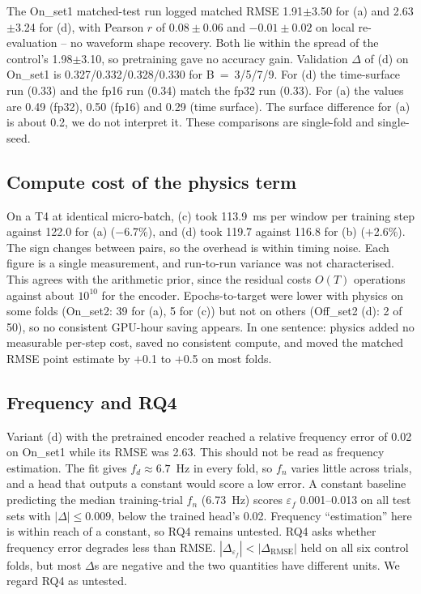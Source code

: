\documentclass[conference]{IEEEtran}
\begin{document}
The On\_set1 matched-test run logged matched RMSE 1.91$\pm$3.50 for (a) and 2.63$\pm$3.24 for (d), with Pearson $r$ of $0.08\pm0.06$ and $-0.01\pm0.02$ on local re-evaluation -- no waveform shape recovery. Both lie within the spread of the control's 1.98$\pm$3.10, so pretraining gave no accuracy gain. Validation $\Delta$ of (d) on On\_set1 is 0.327/0.332/0.328/0.330 for B~=~3/5/7/9. For (d) the time-surface run (0.33) and the fp16 run (0.34) match the fp32 run (0.33). For (a) the values are 0.49 (fp32), 0.50 (fp16) and 0.29 (time surface). The surface difference for (a) is about 0.2, we do not interpret it. These comparisons are single-fold and single-seed.

\subsection{Compute cost of the physics term}
On a T4 at identical micro-batch, (c) took 113.9~ms per window per training step against 122.0 for (a) ($-$6.7\%), and (d) took 119.7 against 116.8 for (b) ($+$2.6\%). The sign changes between pairs, so the overhead is within timing noise. Each figure is a single measurement, and run-to-run variance was not characterised. This agrees with the arithmetic prior, since the residual costs $O(T)$ operations against about $10^{10}$ for the encoder. Epochs-to-target were lower with physics on some folds (On\_set2: 39 for (a), 5 for (c)) but not on others (Off\_set2 (d): 2 of 50), so no consistent GPU-hour saving appears. In one sentence: physics added no measurable per-step cost, saved no consistent compute, and moved the matched RMSE point estimate by $+$0.1 to $+$0.5 on most folds.

\subsection{Frequency and RQ4}
Variant (d) with the pretrained encoder reached a relative frequency error of 0.02 on On\_set1 while its RMSE was 2.63. This should not be read as frequency estimation. The fit gives $f_d \approx 6.7$~Hz in every fold, so $f_n$ varies little across trials, and a head that outputs a constant would score a low error. A constant baseline predicting the median training-trial $f_n$ (6.73~Hz) scores $\varepsilon_f$ 0.001--0.013 on all test sets with $|\Delta| \leq 0.009$, below the trained head's 0.02. Frequency ``estimation'' here is within reach of a constant, so RQ4 remains untested. RQ4 asks whether frequency error degrades less than RMSE. $|\Delta_{\varepsilon_f}| < |\Delta_{\mathrm{RMSE}}|$ held on all six control folds, but most $\Delta$s are negative and the two quantities have different units. We regard RQ4 as untested.
\end{document}
